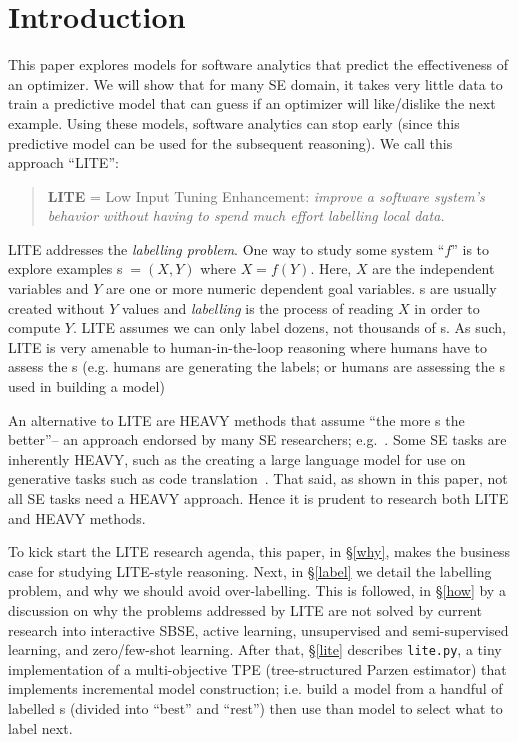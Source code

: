 \newpage\section{Introduction}\label{intro} 
This paper  explores  models for software analytics that    predict the effectiveness of an optimizer.  We will show that for many SE domain,
it takes very little data to train a predictive  model that can guess if an optimizer will like/dislike the next example.  
Using these
models, software analytics can stop early (since this predictive model can be
used for the subsequent reasoning). We call this approach  ``LITE'':
\begin{quote}
    {\bf LITE } = Low Input Tuning Enhancement: {\em
 improve a software system’s behavior
without having to spend much effort labelling local data. }
\end{quote}
LITE addresses the {\em labelling problem}. One way to study some system ``$f$''   
 is to explore examples  {\eg}s$\;=(X,Y)$ where $X=f(Y)$.
 Here,   $X$ are the independent variables
and $Y$ are one or more numeric dependent goal variables.  
{\eg}s are usually created without $Y$ values and 
{\em labelling} is the process of reading   $X$   in order to compute   $Y$.
LITE assumes
we can only label dozens, not thousands  of {\eg}s. As such,
LITE is very amenable to human-in-the-loop reasoning where 
humans have to assess the {\eg}s (e.g. humans are generating the labels; or
humans are assessing the {\eg}s used in building a model) 


An alternative to LITE are HEAVY methods that assume ``the more {\eg}s the better''-- an approach   endorsed by many SE researchers; e.g.~\cite{mcintosh2017fix,rahman2013sample,amasaki2020cross}. 
Some SE tasks are inherently HEAVY, such as the   creating   a large language model for use on  generative tasks such as code translation~\cite{10.1145/3551349.3559555}. That said, as shown in this paper, not all SE tasks need a HEAVY approach. Hence it is prudent to research both LITE and HEAVY methods.

To kick start the LITE research agenda, this paper, in  \S\ref{why},
    makes the business case for studying  LITE-style reasoning.
    Next, in 
  \S\ref{label} we detail the labelling problem, and why we should
    avoid over-labelling.
    This is followed, in  \S\ref{how} by a discussion on why the problems addressed by  LITE  are not solved
    by current research into interactive SBSE, active learning, unsupervised and semi-supervised learning, and zero/few-shot learning.
    After that,  \S\ref{lite}  describes \verb+lite.py+, a tiny
    implementation of a multi-objective TPE (tree-structured Parzen estimator) that   implements incremental model construction;   i.e. build a model from a handful of labelled {\eg}s (divided into ``best'' and ``rest'')
    then use than model to select what to label next.
  
